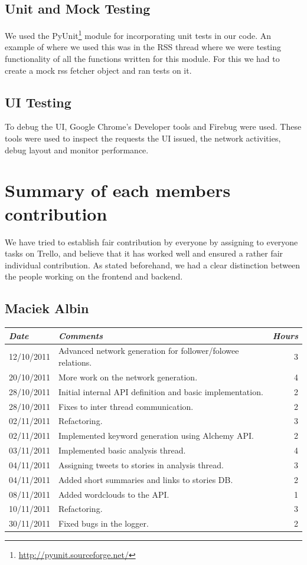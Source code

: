 \documentclass{report}
\begin{document}
		   \subsection{Unit and Mock Testing}

		  	  We used the PyUnit\footnote{\url{http://pyunit.sourceforge.net/}} module for incorporating unit tests in our code. An example of where we used this was in the RSS thread where we were testing functionality of all the functions written for this module. For this we had to create a mock rss fetcher object and ran tests on it.

				\subsection{UI Testing}
				To debug the UI, Google Chrome’s Developer tools and Firebug were used. These tools were used to inspect the requests the UI issued, the network activities, debug layout and monitor performance.
	
		\section{Summary of each members contribution}
		
				We have tried to establish fair contribution by everyone by assigning to everyone tasks on Trello, and believe that it has worked well and ensured a rather fair individual contribution. As stated beforehand, we had a clear distinction between the people working on the frontend and backend.
		
		  \subsection{Maciek Albin}
		    \begin{tabular}{l | p{10cm} r}
		     \emph{\large Date} & \emph{\large Comments} & \emph{\large Hours}\\
		     \hline
		     12/10/2011 & Advanced network generation for follower/folowee relations. & 3\\
		     20/10/2011 & More work on the network generation. & 4\\
		     28/10/2011 & Initial internal API definition and basic implementation. & 2\\
		     28/10/2011 & Fixes to inter thread communication. & 2\\
		     02/11/2011 & Refactoring. & 3\\
		     02/11/2011 & Implemented keyword generation using Alchemy API. & 2\\
		     03/11/2011 & Implemented basic analysis thread. & 4\\
		     04/11/2011 & Assigning tweets to stories in analysis thread. & 3\\
		     04/11/2011 & Added short summaries and links to stories DB. & 2\\
		     08/11/2011 & Added wordclouds to the API. & 1\\
		     10/11/2011 & Refactoring. & 3\\
		     30/11/2011 & Fixed bugs in the logger. & 2
		    \end{tabular}
\end{document}
